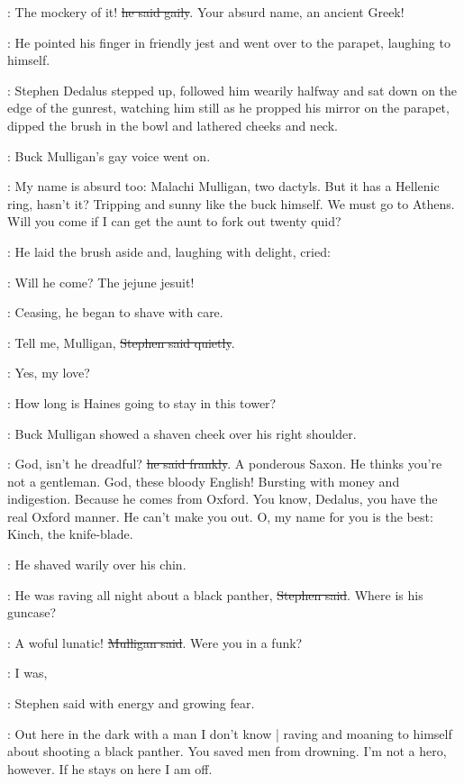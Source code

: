 \Mulligan:
The mockery of it!
\sout{he said gaily}.
Your absurd name, an ancient Greek!

:
He pointed his finger in friendly jest
and went over to the parapet,
laughing to himself.

:
Stephen Dedalus stepped up,
followed him wearily halfway
and sat down on the edge of the gunrest,
watching him still
as he propped his mirror on the parapet,
dipped the brush in the bowl
and lathered cheeks and neck.

:
Buck Mulligan's gay voice went on.

\Mulligan:
My name is absurd too:
Malachi Mulligan, two dactyls.
But it has a Hellenic ring, hasn't it?
Tripping and sunny like the buck himself.
We must go to Athens.
Will you come
if I can get the aunt to fork out twenty quid?

:
He laid the brush aside
and, laughing with delight, cried:

\Mulligan:
Will he come?
The jejune jesuit!

:
Ceasing, he began to shave with care.

\Stephen:
Tell me, Mulligan,
\sout{Stephen said quietly}.

\Mulligan:
Yes, my love?

\Stephen:
How long is Haines going to stay in this tower?

:
Buck Mulligan showed a shaven cheek over his right shoulder.

\Mulligan:
God, isn't he dreadful?
\sout{he said frankly}.
A ponderous Saxon.
He thinks you're not a gentleman.
God, these bloody English!
Bursting with money and indigestion.
Because he comes from Oxford.
You know, Dedalus, you have the real Oxford manner.
He can't make you out.
O, my name for you is the best:
Kinch, the knife-blade.

:
He shaved warily over his chin.

\Stephen:
He was raving all night about a black panther,
\sout{Stephen said}.
Where is his guncase?

\Mulligan:
A woful lunatic!
\sout{Mulligan said}.
Were you in a funk?

\Stephen:
I was,

:
Stephen said with energy and growing fear.

\Stephen:
Out here in the dark
with a man I don't know |
raving and moaning to himself
about shooting a black panther.
You saved men from drowning.
I'm not a hero, however.
If he stays on here
I am off.

